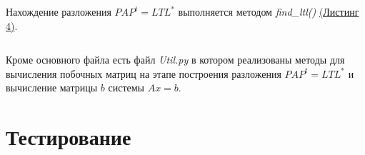 \documentclass[a4paper, 12pt]{article}   	%
\begin{document}
\hypertarget{lst:bucnh-parlett}{}
\inputminted[frame=single,framesep=10pt, fontsize = \small, linenos=true, breaklines]{python}{Bunch-Parlett.py}

\hypertarget{lst:bucnh-kaufman}{}
\inputminted[frame=single,framesep=10pt, fontsize = \small, linenos=true, breaklines]{python}{Bunch-Kaufman.py}

Нахождение разложения $PAP^t = LTL^*$ выполняется методом {\it find\_ltl()} \hyperlink{lst:find-ldl}{(Листинг 4)}.

\hypertarget{lst:find-ldl}{}
\inputminted[frame=single,framesep=10pt, fontsize = \small, linenos=true, breaklines]{python}{Find_ldl.py}

Кроме основного файла есть файл {\it Util.py} в котором реализованы методы для вычисления побочных матриц на этапе построения разложения $PAP^t = LTL^*$ и вычисление матрицы $b$ системы $Ax = b$.

\newpage

\section{Тестирование}
\end{document}
